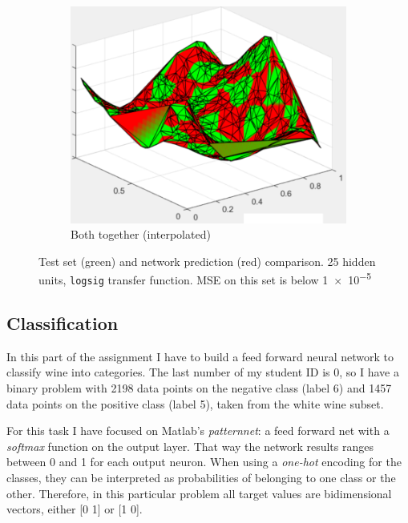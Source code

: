 \documentclass[a4paper, 10pt]{article}
\begin{document}
\begin{figure}[htb]
\begin{adjustwidth}{-1.1cm}{-1.1cm}
\begin{subfigure}[t]{0.29\linewidth}
      \includegraphics[width=1\linewidth]{./project/sim_and_test.png}
      \caption{Both together (interpolated)}
      \label{fig:underfit}
    \end{subfigure}
    \end{adjustwidth}
    \caption{Test set (green) and network prediction (red) comparison. 25 hidden units,
      \texttt{logsig} transfer function. MSE on this set is below \num{1e-5}}
    \label{fig:l5_regression_test}
  \end{figure}

  \subsection{Classification}
  In this part of the assignment I have to build a feed forward neural network to
  classify wine into categories. The last number of my student ID is 0, so I have
  a binary problem with 2198 data points on the negative class (label 6) and 
  1457 data points on the positive class (label 5), taken from the white wine 
  subset. 

  For this task I have focused on Matlab's \emph{patternnet}: a feed forward net
  with a \emph{softmax} function on the output layer. That way the network
  results ranges between 0 and 1 for each output neuron. When using a 
  \emph{one-hot} encoding for the classes, they can be
  interpreted as probabilities of belonging to one class or the other. Therefore,
  in this particular problem all target values are bidimensional vectors, either
  [0 1] or [1 0].
\end{document}
